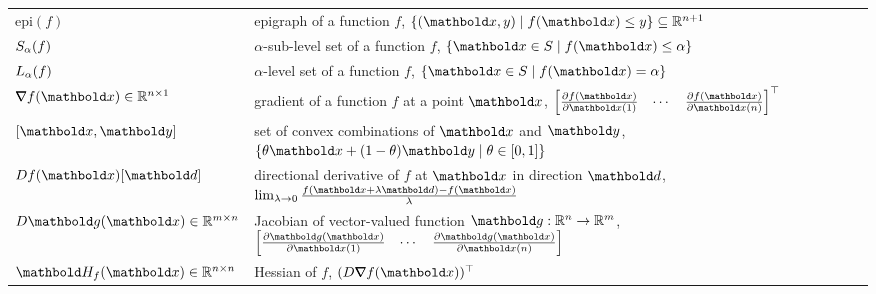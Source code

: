 \begin{fullwidth}
\section*{}\vspace{-0.5cm}
\begin{longtable}{p{2.5cm}l}
   $\mathrm{epi}(f)$ & epigraph of a function $f$, $\{(\vx,y) \mid f(\vx) \leq y\} \subseteq \R^{n+1}$ \\
   $S_\alpha(f)$ & $\alpha$-sub-level set of a function $f$, $\{\vx \in \sS \mid f(\vx) \leq \alpha\}$ \\
   $L_\alpha(f)$ & $\alpha$-level set of a function $f$, $\{\vx \in \sS \mid f(\vx) = \alpha\}$ \\
   $\grad f(\vx) \in \R^{n \times 1}$ & gradient of a function $f$ at a point $\vx$, $\trans{\begin{bmatrix}
        \pdv{f(\vx)}{\vx(1)} & \cdots & \pdv{f(\vx)}{\vx(n)}
    \end{bmatrix}}$ \\
   $[\vx,\vy]$ & set of convex combinations of $\vx$ and $\vy$, $\{\theta\vx + (1-\theta)\vy \mid \theta\in[0,1]\}$ \\
   $D f(\vx)[\vd]$ & directional derivative of $f$ at $\vx$ in direction $\vd$, $\lim_{\lambda \to 0} \frac{f(\vx + \lambda\vd) - f(\vx)}{\lambda}$ \\
   $D \vg(\vx) \in \R^{m \times n}$ & Jacobian of vector-valued function $\vg: \R^n \to \R^m$, $\begin{bmatrix}
        \pdv{\vg(\vx)}{\vx(1)} & \cdots & \pdv{\vg(\vx)}{\vx(n)}
    \end{bmatrix}$ \\
   $\mH_f(\vx) \in \R^{n \times n}$ & Hessian of $f$, $\trans{(D \grad f(\vx))}$ \\
\end{longtable}


\end{fullwidth}
